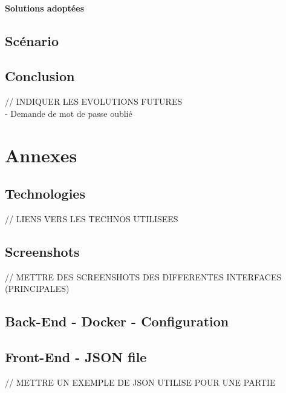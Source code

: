 \documentclass{tnreport}
\begin{document}
\subsection{Solutions adoptées}

\cleardoublepage

\chapter{Scénario}

\cleardoublepage

\chapter{Conclusion}

// INDIQUER LES EVOLUTIONS FUTURES \\
 - Demande de mot de passe oublié

\cleardoublepage

\appendix
\part*{Annexes}

\cleardoublepage

\chapter{Technologies}

// LIENS VERS LES TECHNOS UTILISEES

\cleardoublepage

\chapter{Screenshots}

// METTRE DES SCREENSHOTS DES DIFFERENTES INTERFACES (PRINCIPALES) \\

\cleardoublepage

\chapter{Back-End - Docker - Configuration}
\label{annexe:docker_compose}
\vspace{0.5cm}
\begin{center}
	\vspace*{-0.8in}
	
\end{center}

\cleardoublepage

\chapter{Front-End - JSON file}

// METTRE UN EXEMPLE DE JSON UTILISE POUR UNE PARTIE \\
\end{document}
